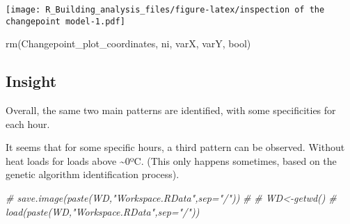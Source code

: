 \documentclass[
]{article}
\newenvironment{Shaded}{\begin{snugshade}}{\end{snugshade}}
\newcommand{\CommentTok}[1]{\textcolor[rgb]{0.56,0.35,0.01}{\textit{#1}}}
\newcommand{\ControlFlowTok}[1]{\textcolor[rgb]{0.13,0.29,0.53}{\textbf{#1}}}
\newcommand{\FunctionTok}[1]{\textcolor[rgb]{0.00,0.00,0.00}{#1}}
\newcommand{\NormalTok}[1]{#1}
\newcommand{\OtherTok}[1]{\textcolor[rgb]{0.56,0.35,0.01}{#1}}
\newcommand{\SpecialCharTok}[1]{\textcolor[rgb]{0.00,0.00,0.00}{#1}}
\begin{document}
\begin{Shaded}
\end{Shaded}

\texttt{[image: R\_Building\_analysis\_files/figure-latex/inspection of the changepoint model-1.pdf]}

\begin{Shaded}
\begin{Highlighting}[]
\FunctionTok{rm}\NormalTok{(Changepoint\_plot\_coordinates, ni, varX, varY, bool)}
\end{Highlighting}
\end{Shaded}

\hypertarget{insight-2}{%
\subsection{Insight}\label{insight-2}}

Overall, the same two main patterns are identified, with some
specificities for each hour.

It seems that for some specific hours, a third pattern can be observed.
Without heat loads for loads above \textasciitilde0ºC. (This only
happens sometimes, based on the genetic algorithm identification
process).

\begin{Shaded}
\begin{Highlighting}[]
\CommentTok{\# save.image(paste(WD,"Workspace.RData",sep="/"))}
\CommentTok{\# }
\CommentTok{\# WD\textless{}{-}getwd()}
\CommentTok{\# load(paste(WD,"Workspace.RData",sep="/"))}
\end{Highlighting}
\end{Shaded}
\end{document}
